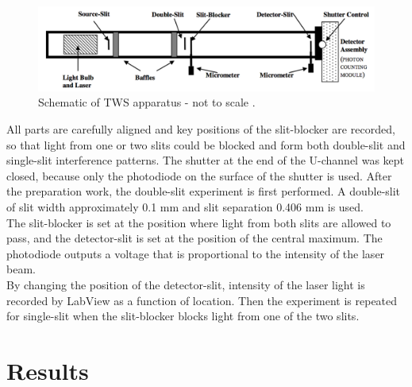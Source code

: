 \documentclass[prb,preprint]{revtex4-1}
\begin{document}
\begin{figure}[h!]
\centering
\includegraphics[width=7in]{dia}
\caption{Schematic of TWS apparatus - not to scale \cite{dia}.}
\label{dia}
\end{figure}
All parts are carefully aligned and key positions of the slit-blocker are recorded, so that light from one or two slits could be blocked and form both double-slit and single-slit interference patterns. The shutter at the end of the U-channel was kept closed, because only the photodiode on the surface of the shutter is used. After the preparation work, the double-slit experiment is first performed. A double-slit of slit width approximately 0.1 mm and slit separation 0.406 mm is used. \\

The slit-blocker is set at the position where light from both slits are allowed to pass, and the detector-slit is set at the position of the central maximum. The photodiode outputs a voltage that is proportional to the intensity of the laser beam. \\ 

By changing the position of the detector-slit, intensity of the laser light is recorded by LabView as a function of location. Then the experiment is repeated for single-slit when the slit-blocker blocks light from one of the two slits. \\
\section{Results}
\end{document}
